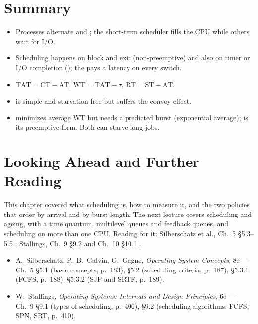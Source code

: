 \documentclass[11pt]{article}
\begin{document}
\section{Summary}

\begin{itemize}
  \item Processes alternate  and ; the
        short-term scheduler fills the CPU while others wait for I/O.
  \item Scheduling happens on block and exit (non-preemptive) and also on timer
        or I/O completion (); the  pays a latency
        on every switch.
  \item $\mathrm{TAT} = \mathrm{CT} - \mathrm{AT}$,
        $\mathrm{WT} = \mathrm{TAT} - \tau$,
        $\mathrm{RT} = \mathrm{ST} - \mathrm{AT}$.
  \item {} is simple and starvation-free but suffers the convoy effect.
  \item {} minimizes average WT but needs a predicted burst (exponential
        average);  is its preemptive form. Both can starve long jobs.
\end{itemize}

\section{Looking Ahead and Further Reading}

This chapter covered what scheduling is, how to measure it, and the two policies
that order by arrival and by burst length. The next lecture covers
 scheduling and ageing,  with a time quantum,
multilevel queues and feedback queues, and scheduling on more than one CPU.
Reading for it: Silberschatz et al., Ch.~5 \S5.3--5.5
\cite{SilberschatzOSC_operating_system_concepts}; Stallings, Ch.~9 \S9.2 and
Ch.~10 \S10.1 \cite{StallingsOS_internals_design_principles}.

\begin{itemize}
  \item A.~Silberschatz, P.~B.~Galvin, G.~Gagne, \emph{Operating System
        Concepts}, 8e --- Ch.~5 \S5.1 (basic concepts, p.~183), \S5.2
        (scheduling criteria, p.~187), \S5.3.1 (FCFS, p.~188), \S5.3.2 (SJF and
        SRTF, p.~189).
  \item W.~Stallings, \emph{Operating Systems: Internals and Design
        Principles}, 6e --- Ch.~9 \S9.1 (types of scheduling, p.~406), \S9.2
        (scheduling algorithms: FCFS, SPN, SRT, p.~410).
\end{itemize}
\end{document}
